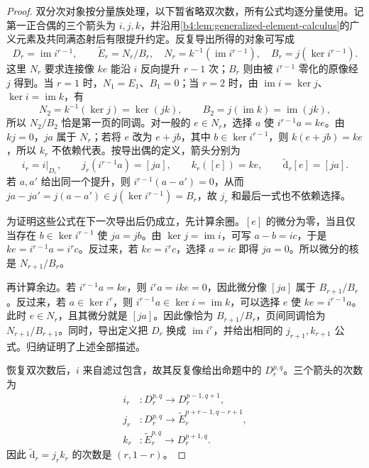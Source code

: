 \begin{proof}
	双分次对象按分量族处理，以下暂省略双次数，所有公式均逐分量使用。记第一正合偶的三个箭头为 \(i,j,k\)，并沿用\cref{b4:lem:generalized-element-calculus}的广义元素及共同满态射后有限提升约定。反复导出所得的对象可写成
	\[
		D_r=\operatorname{im}i^{r-1},\qquad \widetilde E_r=N_r/B_r, \quad N_r=k^{-1}(\operatorname{im}i^{r-1}),\quad B_r=j(\ker i^{r-1}).
	\]
	这里 \(N_r\) 要求连接像 \(ke\) 能沿 \(i\) 反向提升 \(r-1\) 次；\(B_r\) 则由被 \(i^{r-1}\) 零化的原像经 \(j\) 得到。当 \(r=1\) 时，\(N_1=E_1\)、\(B_1=0\)；当 \(r=2\) 时，由 \(\operatorname{im}i=\ker j\)、\(\ker i=\operatorname{im}k\)，有
	\[
		N_2=k^{-1}(\ker j)=\ker(jk),\qquad B_2=j(\operatorname{im}k)=\operatorname{im}(jk),
	\]
	所以 \(N_2/B_2\) 恰是第一页的同调。对一般的 \(e\in N_r\)，选择 \(a\) 使 \(i^{r-1}a=ke\)。由 \(kj=0\)，\(ja\) 属于 \(N_r\)；若将 \(e\) 改为 \(e+jb\)，其中 \(b\in\ker i^{r-1}\)，则 \(k(e+jb)=ke\)，所以 \(k_r\) 不依赖代表。按导出偶的定义，箭头分别为
	\[
		i_r=i|_{D_r},\qquad j_r(i^{r-1}a)=[ja],\qquad k_r([e])=ke,\qquad \widetilde{\mathrm{d}}_r[e]=[ja].
	\]
	若 \(a,a'\) 给出同一个提升，则 \(i^{r-1}(a-a')=0\)，从而 \(ja-ja'=j(a-a')\in j(\ker i^{r-1})=B_r\)，故 \(j_r\) 和最后一式也不依赖选择。

	为证明这些公式在下一次导出后仍成立，先计算余圈。\([e]\) 的微分为零，当且仅当存在 \(b\in\ker i^{r-1}\) 使 \(ja=jb\)。由 \(\ker j=\operatorname{im}i\)，可写 \(a-b=ic\)，于是 \(ke=i^{r-1}a=i^rc\)。反过来，若 \(ke=i^rc\)，选择 \(a=ic\) 即得 \(ja=0\)。所以微分的核是 \(N_{r+1}/B_r\)。

	再计算余边。若 \(i^{r-1}a=ke\)，则 \(i^ra=ike=0\)，因此微分像 \([ja]\) 属于 \(B_{r+1}/B_r\)。反过来，若 \(a\in\ker i^r\)，则 \(i^{r-1}a\in\ker i=\operatorname{im}k\)，可以选择 \(e\) 使 \(ke=i^{r-1}a\)。此时 \(e\in N_r\)，且其微分就是 \([ja]\)。因此像恰为 \(B_{r+1}/B_r\)，页间同调恰为 \(N_{r+1}/B_{r+1}\)。同时，导出定义把 \(D_r\) 换成 \(\operatorname{im}i^r\)，并给出相同的 \(j_{r+1},k_{r+1}\) 公式。归纳证明了上述全部描述。

	恢复双次数后，\(i\) 来自滤过包含，故其反复像给出命题中的 \(D_r^{p,q}\)。三个箭头的次数为
	\[
		\begin{aligned}
			i_r&:D_r^{p,q}\longrightarrow D_r^{p-1,q+1},\\
			j_r&:D_r^{p,q}\longrightarrow\widetilde E_r^{p+r-1,q-r+1},\\
			k_r&:\widetilde E_r^{p,q}\longrightarrow D_r^{p+1,q}.
		\end{aligned}
	\]
	因此 \(\widetilde{\mathrm{d}}_r=j_rk_r\) 的次数是 \((r,1-r)\)。


\end{proof}
